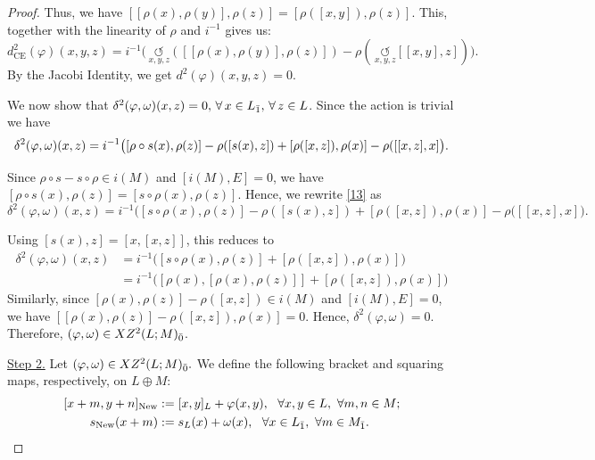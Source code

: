 \documentclass[12pt]{amsart}
\newcommand {\ce}{{\text{CE}}}
\begin{document}
\begin{proof}
Thus, we have $[[\rho(x),\rho(y)],\rho(z)]=[\rho([x,y]),\rho(z)]$. This, together with the linearity of $\rho$ and $i^{-1}$ gives us:
\[d_{\ce}^2(\varphi)(x,y,z)= i^{-1}\bigl(\, \underset{x,y,z}{\circlearrowleft}([[\rho(x),\rho(y)],\rho(z)])-\rho(\,\underset{x,y,z}{\circlearrowleft}[[x,y],z])\bigr).\]
By the Jacobi Identity, we get $d^2(\varphi)(x,y,z)=0$. 

\vspace{0.5 em}

We now show that $\delta^2(\varphi,\omega)(x,z)=0,\, \forall\,x\in L_{{\bar1}},\, \forall\,z\in L$. Since the action is trivial we have
\vspace{1mm}
\begin{equation}\label{13}
\delta^2(\varphi,\omega)(x,z)=i^{-1}\bigl([\rho \circ s(x),\rho(z)]-\rho([s(x),z])+[\rho([x,z]),\rho(x)]-\rho([[x,z],x]\bigl).
\vspace{1mm}
\end{equation}

 Since $\rho \circ s -s\circ\rho\in i(M)$ and $[i(M),E]=0$, we have \([\rho \circ s(x), \rho(z)]=[s \circ \rho(x),\rho(z)]\). Hence, we rewrite \eqref{13} as
\begin{equation*}
\delta^2(\varphi,\omega)(x,z)=i^{-1}\bigl([s \circ \rho(x),\rho(z)]-\rho([s(x),z])+[\rho([x,z]),\rho(x)]-\rho([[x,z],x]\bigr).
\end{equation*}

Using $[s(x),z]=[x,[x,z]]$, this reduces to
    \begin{align*}
        \delta^2(\varphi,\omega)(x,z)&=i^{-1}\bigl([s \circ \rho(x),\rho(z)]+[\rho([x,z]),\rho(x)]\bigr)\\
        &=i^{-1}\bigl([\rho(x),[\rho(x),\rho(z)]]+[\rho([x,z]),\rho(x)]\bigr)    
    \end{align*}
Similarly, since $[\rho(x),\rho(z)]-\rho([x,z])\in i(M)$ and $[i(M),E]=0$, we have $[[\rho(x),\rho(z)]-\rho([x,z]),\rho(x)]=0$. Hence, $\delta^2(\varphi,\omega)=0$. Therefore, $(\varphi,\omega)\in XZ^2(L;M)_{{\bar0}}$.

\vspace{1 em}

\noindent\underline{Step 2.} Let $(\varphi,\omega) \in XZ^2(L;M)_{{\bar0}}.$ We define the following bracket and squaring maps, respectively, on $ L \oplus M$:
\begin{align}\label{14}
    [x+m,y+n]_{\mathrm{New}} &:= [x,y]_L+\varphi(x,y), \ \ \forall x,y\in L,\ \forall m,n \in M;\\
    s_{ \mathrm{New}}(x+m) &:= s_{L}(x) + \omega(x), \ \ \forall x\in L_{{\bar1}},\ \forall m \in M_{{\bar1}}.
\end{align}


\end{proof}
\end{document}
